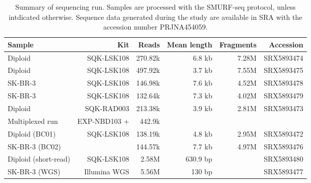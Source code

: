 \begin{table}[H]
  \centering
  \begin{tabular*}{\columnwidth}{@{\extracolsep{\fill}}lrrrrr}
    \hline
    Sample & Kit & Reads & Mean length & Fragments & Accession \\
    \hline
    Diploid & SQK-LSK108 & 270.82k & 6.8 kb & 7.28M & SRX5893474 \\
    Diploid & SQK-LSK108 & 497.92k & 3.7 kb & 7.55M & SRX5893475 \\
    SK-BR-3 & SQK-LSK108 & 146.98k & 7.6 kb & 4.52M & SRX5893478 \\
    SK-BR-3 & SQK-LSK108 & 132.64k & 7.3 kb & 4.02M & SRX5893479 \\
    \hline
    Diploid & SQK-RAD003 & 213.38k & 3.9 kb & 2.81M & SRX5893473 \\
    \hline
    Multiplexed run & EXP-NBD103 + & 442.9k & & &  \\
    Diploid (BC01) & SQK-LSK108 & 138.19k & 4.8 kb & 2.95M & SRX5893472 \\
    SK-BR-3 (BC02) &  & 144.57k & 7.7 kb & 4.97M & SRX5893476 \\
    \hline
    \hline
    Diploid (short-read) & SQK-LSK108 & 2.58M & 630.9 bp & & SRX5893480 \\
    \hline
    \hline
    SK-BR-3 (WGS) & Illumina WGS & 5.56M & 130 bp & &  SRX5893477 \\
    \hline
  \end{tabular*}
  \caption{Summary of sequencing run. Samples are processed with the
    SMURF-seq protocol, unless intdicated otherwise. Sequence data
    generated during the study are available in SRA with the accession
    number PRJNA454059.}
  \label{seq-summary}
\end{table}

